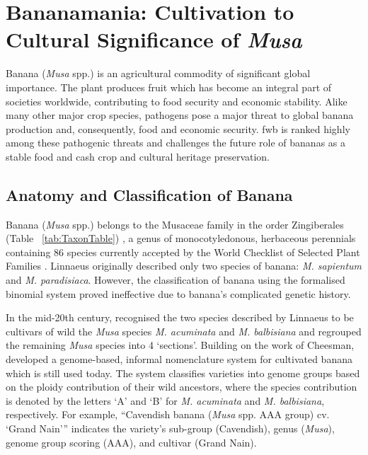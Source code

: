 \section{Bananamania: Cultivation to Cultural Significance of \textit{Musa}}

Banana (\textit{Musa} spp.) is an agricultural commodity of significant global importance. The plant produces fruit which has become an integral part of societies worldwide, contributing to food security and economic stability. Alike many other major crop species, pathogens pose a major threat to global banana production and, consequently, food and economic security. \ac{fwb} is ranked highly among these pathogenic threats and challenges the future role of bananas as a stable food and cash crop and cultural heritage preservation. 

\subsection{Anatomy and Classification of Banana}  

Banana (\textit{Musa} spp.) belongs to the Musaceae family in the order Zingiberales (Table ~\ref{tab:TaxonTable}) \parencite{Schoch2020}, a genus of monocotyledonous, herbaceous perennials containing 86 species currently accepted by the World Checklist of Selected Plant Families \parencite{WCSPF2023}. Linnaeus originally described only two species of banana: \textit{M. sapientum }and \textit{M. paradisiaca}. However, the classification of banana using the formalised binomial system proved ineffective due to banana’s complicated genetic history.

In the mid-20th century, \textcite{Cheesman1947} recognised the two species described by Linnaeus to be cultivars of wild the \textit{Musa} species \textit{M. acuminata }and \textit{M. balbisiana} and regrouped the remaining \textit{Musa} species into 4 ‘sections’. Building on the work of Cheesman, \textcite{Simmonds1955} developed a genome-based, informal nomenclature system for cultivated banana which is still used today. The system classifies varieties into genome groups based on the ploidy contribution of their wild ancestors, where the species contribution is denoted by the letters ‘A’ and ‘B’ for \textit{M. acuminata} and \textit{M. balbisiana}, respectively. For example, “Cavendish banana (\textit{Musa } spp. AAA group) cv. ‘Grand Nain’” indicates the variety’s sub-group (Cavendish), genus (\textit{Musa}), genome group scoring (AAA), and cultivar (Grand Nain).

